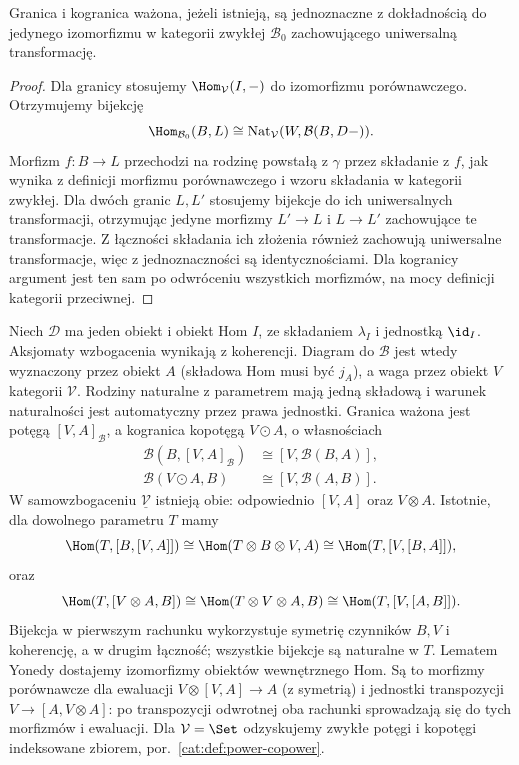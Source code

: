 \begin{stwierdzenie}\label{cat:prop:enriched-weighted-unique}
Granica i kogranica ważona, jeżeli istnieją, są jednoznaczne z dokładnością do jedynego izomorfizmu w kategorii zwykłej $\mathcal B_0$ zachowującego uniwersalną transformację.
\end{stwierdzenie}
\begin{proof}
Dla granicy stosujemy $\Hom_{\mathcal V}(I,-)$ do izomorfizmu porównawczego. Otrzymujemy bijekcję
\[
 \Hom_{\mathcal B_0}(B,L)
 \cong\operatorname{Nat}_{\mathcal V}(W,\mathcal B(B,D-)).
\]
Morfizm $f:B\to L$ przechodzi na rodzinę powstałą z $\gamma$ przez składanie z $f$, jak wynika z definicji morfizmu porównawczego i wzoru składania w kategorii zwykłej. Dla dwóch granic $L,L'$ stosujemy bijekcje do ich uniwersalnych transformacji, otrzymując jedyne morfizmy $L'\to L$ i $L\to L'$ zachowujące te transformacje. Z łączności składania ich złożenia również zachowują uniwersalne transformacje, więc z jednoznaczności są identycznościami. Dla kogranicy argument jest ten sam po odwróceniu wszystkich morfizmów, na mocy definicji kategorii przeciwnej.
\end{proof}

\begin{przyklad}\label{cat:ex:enriched-tensor-cotensor}
Niech $\mathcal D$ ma jeden obiekt i obiekt Hom $I$, ze składaniem $\lambda_I$ i jednostką $\id_I$. Aksjomaty wzbogacenia wynikają z koherencji. Diagram do $\mathcal B$ jest wtedy wyznaczony przez obiekt $A$ (składowa Hom musi być $j_A$), a waga przez obiekt $V$ kategorii $\mathcal V$. Rodziny naturalne z parametrem mają jedną składową i warunek naturalności jest automatyczny przez prawa jednostki. Granica ważona jest potęgą $[V,A]_{\mathcal B}$, a kogranica kopotęgą $V\odot A$, o własnościach
\[
\begin{aligned}
 \mathcal B(B,[V,A]_{\mathcal B})&\cong[V,\mathcal B(B,A)],\\
 \mathcal B(V\odot A,B)&\cong[V,\mathcal B(A,B)].
\end{aligned}
\]
W samowzbogaceniu $\underline{\mathcal V}$ istnieją obie: odpowiednio $[V,A]$ oraz $V\otimes A$. Istotnie, dla dowolnego parametru $T$ mamy
\[
 \Hom(T,[B,[V,A]])
 \cong\Hom(T\otimes B\otimes V,A)
 \cong\Hom(T,[V,[B,A]]),
\]
oraz
\[
 \Hom(T,[V\otimes A,B])
 \cong\Hom(T\otimes V\otimes A,B)
 \cong\Hom(T,[V,[A,B]]).
\]
Bijekcja w pierwszym rachunku wykorzystuje symetrię czynników $B,V$ i koherencję, a w drugim łączność; wszystkie bijekcje są naturalne w $T$. Lematem Yonedy dostajemy izomorfizmy obiektów wewnętrznego Hom. Są to morfizmy porównawcze dla ewaluacji $V\otimes[V,A]\to A$ (z symetrią) i jednostki transpozycji $V\to[A,V\otimes A]$: po transpozycji odwrotnej oba rachunki sprowadzają się do tych morfizmów i ewaluacji. Dla $\mathcal V=\Set$ odzyskujemy zwykłe potęgi i kopotęgi indeksowane zbiorem, por.~\ref{cat:def:power-copower}.
\end{przyklad}
